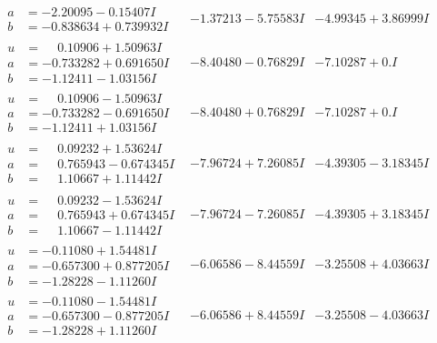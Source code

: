 \documentclass[1p]{elsarticle_modified}
\theoremstyle{definition}
\begin{document}
$$\begin{array}{c|c|c}
\begin{aligned}
a &= -2.20095 - 0.15407 I \\
b &= -0.838634 + 0.739932 I\end{aligned}
 & -1.37213 - 5.75583 I & -4.99345 + 3.86999 I \\ \hline\begin{aligned}
u &= \phantom{-}0.10906 + 1.50963 I \\
a &= -0.733282 + 0.691650 I \\
b &= -1.12411 - 1.03156 I\end{aligned}
 & -8.40480 - 0.76829 I & -7.10287 + 0. I\phantom{ +0.000000I} \\ \hline\begin{aligned}
u &= \phantom{-}0.10906 - 1.50963 I \\
a &= -0.733282 - 0.691650 I \\
b &= -1.12411 + 1.03156 I\end{aligned}
 & -8.40480 + 0.76829 I & -7.10287 + 0. I\phantom{ +0.000000I} \\ \hline\begin{aligned}
u &= \phantom{-}0.09232 + 1.53624 I \\
a &= \phantom{-}0.765943 - 0.674345 I \\
b &= \phantom{-}1.10667 + 1.11442 I\end{aligned}
 & -7.96724 + 7.26085 I & -4.39305 - 3.18345 I \\ \hline\begin{aligned}
u &= \phantom{-}0.09232 - 1.53624 I \\
a &= \phantom{-}0.765943 + 0.674345 I \\
b &= \phantom{-}1.10667 - 1.11442 I\end{aligned}
 & -7.96724 - 7.26085 I & -4.39305 + 3.18345 I \\ \hline\begin{aligned}
u &= -0.11080 + 1.54481 I \\
a &= -0.657300 + 0.877205 I \\
b &= -1.28228 - 1.11260 I\end{aligned}
 & -6.06586 - 8.44559 I & -3.25508 + 4.03663 I \\ \hline\begin{aligned}
u &= -0.11080 - 1.54481 I \\
a &= -0.657300 - 0.877205 I \\
b &= -1.28228 + 1.11260 I\end{aligned}
 & -6.06586 + 8.44559 I & -3.25508 - 4.03663 I \\ \hline\begin{aligned}

\end{aligned}
\end{array}$$
\end{document}
